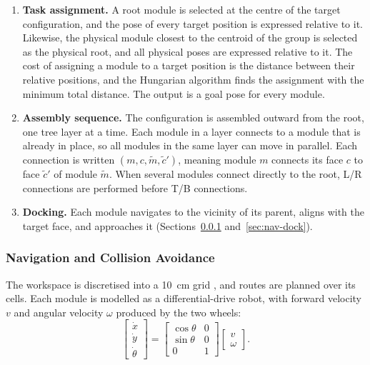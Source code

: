 \documentclass[12pt,a4paper]{article}
\begin{document}
\begin{enumerate}[topsep=2pt,itemsep=2pt,parsep=0pt,leftmargin=1.5em]
\item \textbf{Task assignment.} A root module is selected at the centre of the target configuration, and the pose of every target position is expressed relative to it. Likewise, the physical module closest to the centroid of the group is selected as the physical root, and all physical poses are expressed relative to it. The cost of assigning a module to a target position is the distance between their relative positions, and the Hungarian algorithm \cite{kuhn1955,munkres1957} finds the assignment with the minimum total distance. The output is a goal pose for every module.
\item \textbf{Assembly sequence.} The configuration is assembled outward from the root, one tree layer at a time. Each module in a layer connects to a module that is already in place, so all modules in the same layer can move in parallel. Each connection is written $(m, c, \tilde{m}, \tilde{c}')$, meaning module $m$ connects its face $c$ to face $\tilde{c}'$ of module $\tilde{m}$. When several modules connect directly to the root, L/R connections are performed before T/B connections.
\item \textbf{Docking.} Each module navigates to the vicinity of its parent, aligns with the target face, and approaches it (Sections~\ref{sec:nav-avoid} and~\ref{sec:nav-dock}).
\end{enumerate}

\subsubsection{Navigation and Collision Avoidance}
\label{sec:nav-avoid}

The workspace is discretised into a \SI{10}{cm} grid \cite{liu2023}, and routes are planned over its cells. Each module is modelled as a differential-drive robot, with forward velocity $v$ and angular velocity $\omega$ produced by the two wheels:
\begin{equation}
\begin{bmatrix} \dot{x} \\ \dot{y} \\ \dot{\theta} \end{bmatrix} =
\begin{bmatrix} \cos\theta & 0 \\ \sin\theta & 0 \\ 0 & 1 \end{bmatrix}
\begin{bmatrix} v \\ \omega \end{bmatrix}.
\end{equation}
\end{document}
